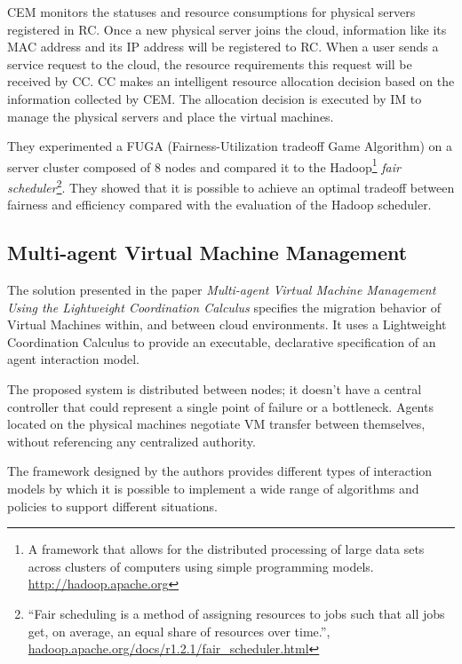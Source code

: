 CEM monitors the statuses and resource consumptions for physical servers registered in RC. Once a new physical server joins the cloud, information like its MAC address and its IP address will be registered to RC. When a user sends a service request to the cloud, the resource requirements this request will be received by CC. CC makes an intelligent resource allocation decision based on the information collected by CEM. The allocation decision is executed by IM to manage the physical servers and place the virtual machines.\cite[p.~3]{Xu:2014do}

They experimented a FUGA (Fairness-Utilization tradeoff Game Algorithm) on a server cluster composed of 8 nodes and compared it to the Hadoop\footnote{A framework that allows for the distributed processing of large data sets across clusters of computers using simple programming models. \url{http://hadoop.apache.org}} \textit{fair scheduler}\footnote{``Fair scheduling is a method of assigning resources to jobs such that all jobs get, on average, an equal share of resources over time.'', \url{hadoop.apache.org/docs/r1.2.1/fair_scheduler.html}}. They showed that it is possible to achieve an optimal tradeoff between fairness and efficiency compared with the evaluation of the Hadoop scheduler.

\subsection{Multi-agent Virtual Machine Management}
\label{sec:sota_mutli_agent}
The solution presented in the paper \textit{Multi-agent Virtual Machine Management Using the Lightweight Coordination Calculus} specifies the migration behavior of Virtual Machines within, and between cloud environments. It uses a Lightweight Coordination Calculus to provide an executable, declarative specification of an agent interaction model\cite{Anderson:2013bh}.

The proposed system is distributed between nodes; it doesn't have a central controller that could represent a single point of failure or a bottleneck. Agents located on the physical machines negotiate VM transfer between themselves, without referencing any centralized authority\cite[p.~124]{Anderson:2013bh}.

The framework designed by the authors provides different types of interaction models by which it is possible to implement a wide range of algorithms and policies to support different situations.

